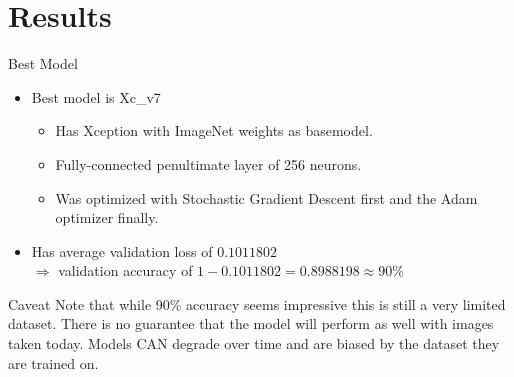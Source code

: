 \documentclass{beamer}
\makeatletter
\newcommand{\mlcell}[1]{\begin{tabular}{@{}c@{}}#1\end{tabular}}
\makeatother
\begin{document}
\section{Results}

\begin{frame}{Best Model}
\begin{itemize}
 \item Best model is Xc\_v7
  \begin{itemize}
    \item Has Xception with ImageNet weights as basemodel.
    \item Fully-connected penultimate layer of 256 neurons.
    \item Was optimized with Stochastic Gradient Descent first and the Adam optimizer finally. 
  \end{itemize}
 \item Has average validation loss of $0.1011802$ \\ $\Rightarrow$ validation accuracy of $ 1 - 0.1011802 = 0.8988198 \approx 90\%$
\end{itemize}
\end{frame}

\begin{frame}{Caveat}
Note that while 90\% accuracy seems impressive this is still a very limited dataset.
There is no guarantee that the model will perform as well with images taken today.
Models CAN degrade over time and are biased by the dataset they are trained on.
\end{frame}
\end{document}
